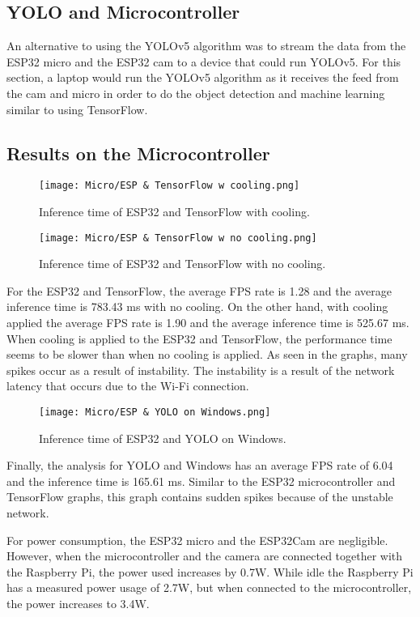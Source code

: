 \documentclass[Report]{IEEEtran}
\begin{document}
\subsection{YOLO and Microcontroller}
An alternative to using the YOLOv5 algorithm was to stream the data from the ESP32 micro and the ESP32 cam to a device that could run YOLOv5. For this section, a laptop would run the YOLOv5 algorithm as it receives the feed from the cam and micro in order to do the object detection and machine learning similar to using TensorFlow. 

\subsection{Results on the Microcontroller}

\begin{figure}[htbp]
\centerline{\texttt{[image: Micro/ESP \& TensorFlow w cooling.png]}}
\caption{Inference time of ESP32 and TensorFlow with cooling.}
\label{fig}
\end{figure}
\begin{figure}[htbp]
\centerline{\texttt{[image: Micro/ESP \& TensorFlow w no cooling.png]}}
\caption{Inference time of ESP32 and TensorFlow with no cooling.}
\label{fig}
\end{figure}

For the ESP32 and TensorFlow, the average FPS rate is 1.28 and the average inference time is 783.43 ms with no cooling. On the other hand, with cooling applied the average FPS rate is 1.90 and the average inference time is 525.67 ms. When cooling is applied to the ESP32 and TensorFlow, the performance time seems to be slower than when no cooling is applied. As seen in the graphs, many spikes occur as a result of instability. The instability is a result of the network latency that occurs due to the Wi-Fi connection. 

\begin{figure}[htbp]
\centerline{\texttt{[image: Micro/ESP \& YOLO on Windows.png]}}
\caption{Inference time of ESP32 and YOLO on Windows.}
\label{fig}
\end{figure}

Finally, the analysis for YOLO and Windows has an average FPS rate of 6.04 and the inference time is 165.61 ms. Similar to the ESP32 microcontroller and TensorFlow graphs, this graph contains sudden spikes because of the unstable network. 

For power consumption, the ESP32 micro and the ESP32Cam are negligible. However, when the microcontroller and the camera are connected together with the Raspberry Pi, the power used increases by 0.7W. While idle the Raspberry Pi has a measured power usage of 2.7W, but when connected to the microcontroller, the power increases to 3.4W.
\end{document}
